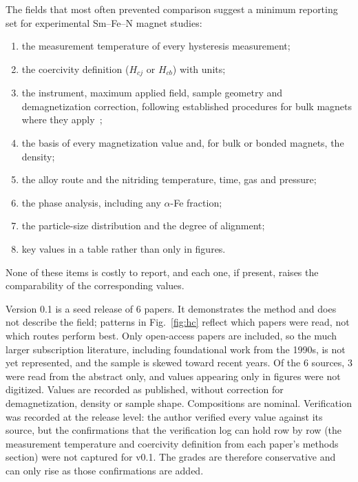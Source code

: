 \documentclass[10pt,twocolumn,letterpaper]{article}
\makeatletter
\renewcommand\subsection{\@startsection{subsection}{2}{\z@}{1.8ex plus .4ex}{1ex}{\centering\normalfont\small\bfseries}}
\makeatother
\begin{document}
The fields that most often prevented comparison suggest a minimum reporting set for experimental Sm--Fe--N magnet studies:
\begin{enumerate}\setlength{\itemsep}{0pt}
\item the measurement temperature of every hysteresis measurement;
\item the coercivity definition ($H_{cj}$ or $H_{cb}$) with units;
\item the instrument, maximum applied field, sample geometry and demagnetization correction, following established procedures for bulk magnets where they apply~\cite{iec604045,astma977};
\item the basis of every magnetization value and, for bulk or bonded magnets, the density;
\item the alloy route and the nitriding temperature, time, gas and pressure;
\item the phase analysis, including any $\alpha$-Fe fraction;
\item the particle-size distribution and the degree of alignment;
\item key values in a table rather than only in figures.
\end{enumerate}
None of these items is costly to report, and each one, if present, raises the comparability of the corresponding values.

\subsection{Limitations}\label{sec:limits}

Version 0.1 is a seed release of 6 papers. It demonstrates the method and does not describe the field; patterns in Fig.~\ref{fig:hc} reflect which papers were read, not which routes perform best. Only open-access papers are included, so the much larger subscription literature, including foundational work from the 1990s, is not yet represented, and the sample is skewed toward recent years. Of the 6 sources, 3 were read from the abstract only, and values appearing only in figures were not digitized. Values are recorded as published, without correction for demagnetization, density or sample shape. Compositions are nominal. Verification was recorded at the release level: the author verified every value against its source, but the confirmations that the verification log can hold row by row (the measurement temperature and coercivity definition from each paper's methods section) were not captured for v0.1. The grades are therefore conservative and can only rise as those confirmations are added.
\end{document}
